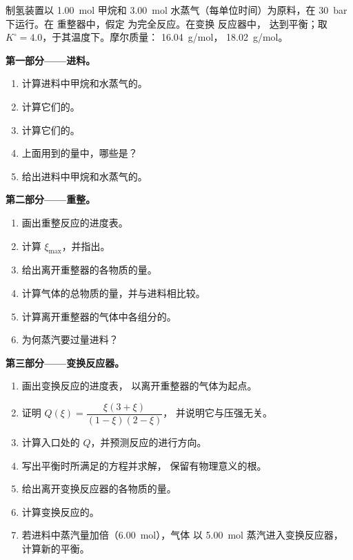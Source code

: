\begin{problem}
\label{pb:b1:extent-q-and-k:1}
制氢装置以 \qty{1.00}{mol} 甲烷和
\qty{3.00}{mol} 水蒸气（每单位时间）为原料，在 \qty{30}{bar} 下运行。在
重整器中，假定  为完全反应。在变换
反应器中， 达到平衡；取 $K^\circ =
4.0$，于其温度下。摩尔质量： \qty{16.04}{g/mol}，
 \qty{18.02}{g/mol}。

\medskip
\noindent\textbf{第一部分——进料。}
\begin{enumerate}
  \item 计算进料中甲烷和水蒸气的。
  \item 计算它们的。
  \item 计算它们的。
  \item 上面用到的量中，哪些是？
  \item 给出进料中甲烷和水蒸气的。
\end{enumerate}

\medskip
\noindent\textbf{第二部分——重整。}
\begin{enumerate}[resume]
  \item 画出重整反应的进度表。
  \item 计算 $\xi_{\max}$，并指出。
  \item 给出离开重整器的各物质的量。
  \item 计算气体的总物质的量，并与进料相比较。
  \item 计算离开重整器的气体中各组分的。
  \item 为何蒸汽要过量进料？
\end{enumerate}

\medskip
\noindent\textbf{第三部分——变换反应器。}
\begin{enumerate}[resume]
  \item 画出变换反应的进度表，
        以离开重整器的气体为起点。
  \item 证明 $Q(\xi) = \dfrac{\xi(3 + \xi)}{(1 - \xi)(2 - \xi)}$，
        并说明它与压强无关。
  \item 计算入口处的 $Q$，并预测反应的进行方向。
  \item 写出平衡时所满足的方程并求解，
        保留有物理意义的根。
  \item 给出离开变换反应器的各物质的量。
  \item 计算变换反应的。
  \item 若进料中蒸汽量加倍（\qty{6.00}{mol}），气体
        以 \qty{5.00}{mol} 蒸汽进入变换反应器，
        计算新的平衡。
\end{enumerate}


\end{problem}
